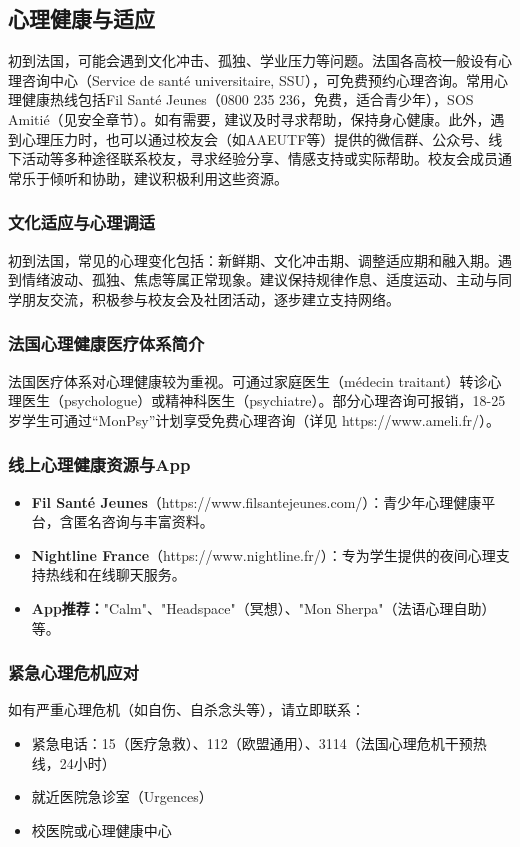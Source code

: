 \subsection{心理健康与适应}

初到法国，可能会遇到文化冲击、孤独、学业压力等问题。法国各高校一般设有心理咨询中心（Service de santé universitaire, SSU），可免费预约心理咨询。常用心理健康热线包括Fil Santé Jeunes（0800 235 236，免费，适合青少年），SOS Amitié（见安全章节）。如有需要，建议及时寻求帮助，保持身心健康。此外，遇到心理压力时，也可以通过校友会（如AAEUTF等）提供的微信群、公众号、线下活动等多种途径联系校友，寻求经验分享、情感支持或实际帮助。校友会成员通常乐于倾听和协助，建议积极利用这些资源。

\subsubsection{文化适应与心理调适}
初到法国，常见的心理变化包括：新鲜期、文化冲击期、调整适应期和融入期。遇到情绪波动、孤独、焦虑等属正常现象。建议保持规律作息、适度运动、主动与同学朋友交流，积极参与校友会及社团活动，逐步建立支持网络。

\subsubsection{法国心理健康医疗体系简介}
法国医疗体系对心理健康较为重视。可通过家庭医生（médecin traitant）转诊心理医生（psychologue）或精神科医生（psychiatre）。部分心理咨询可报销，18-25岁学生可通过“MonPsy”计划享受免费心理咨询（详见 https://www.ameli.fr/）。

\subsubsection{线上心理健康资源与App}
\begin{itemize}
    \item \textbf{Fil Santé Jeunes}（https://www.filsantejeunes.com/）：青少年心理健康平台，含匿名咨询与丰富资料。
    \item \textbf{Nightline France}（https://www.nightline.fr/）：专为学生提供的夜间心理支持热线和在线聊天服务。
    \item \textbf{App推荐：}"Calm"、"Headspace"（冥想）、"Mon Sherpa"（法语心理自助）等。
\end{itemize}

\subsubsection{紧急心理危机应对}
如有严重心理危机（如自伤、自杀念头等），请立即联系：
\begin{itemize}
    \item 紧急电话：15（医疗急救）、112（欧盟通用）、3114（法国心理危机干预热线，24小时）
    \item 就近医院急诊室（Urgences）
    \item 校医院或心理健康中心
\end{itemize}

